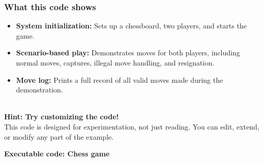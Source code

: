 \subsubsection{What this code shows}\label{ASlJlMd121cNtdX1SkcSj}

\begin{itemize}
\item
\protect{}\label{luJS266p8I67Y6So6z68I}
\textbf{System initialization:} Sets up a chessboard, two players, and starts the game.
\item
\protect{}\label{tGkpQVuVFZ0pnf-F15b3c}
\textbf{Scenario-based play:} Demonstrates moves for both players, including normal moves, captures, illegal move handling, and resignation.
\item
\protect{}\label{H6wA__sbWykH_E-VBktpu}
\textbf{Move log:} Prints a full record of all valid moves made during the demonstration.
\end{itemize}
\\
\textbf{Hint: Try customizing the code!}
\\
This code is designed for experimentation, not just reading. You can edit, extend, or modify any part of the example.

\textbf{Executable code: Chess game}

